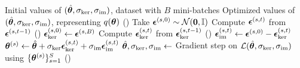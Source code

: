 \begin{algorithm}[t]
  \caption{The VIKING algorithm}
  \label{alg:viking}
  \begin{algorithmic}[1]
  \REQUIRE Initial values of $(\hat{\bm{\theta}}, \sigma_{\ker}, \sigma_{\operatorname{im}})$, dataset with $B$ mini-batches
  \ENSURE Optimized values of $(\hat{\bm{\theta}}, \sigma_{\ker}, \sigma_{\operatorname{im}})$, representing $q(\bm{\theta})$ ()
      \STATE Take $\bm{\epsilon}^{(s, 0)} \sim \mathcal{N}(\mathbf{0}, \mathbb{I})$
        \STATE Compute $\bm{\epsilon}^{(s, t)}$ from $\bm{\epsilon}^{(s, t-1)}$ () 
      \ENDFOR
      \STATE $\bm{\epsilon}_{\ker}^{(s, 0)} \gets \bm{\epsilon}^{(s, B)}$
    \ENDFOR
        \STATE Compute $\bm{\epsilon}_{\ker}^{(s, t)}$ from $\bm{\epsilon}_{\ker}^{(s, t-1)}$ ()
        \STATE $\bm{\epsilon}_{\operatorname{im}}^{(s, t)} \gets \bm{\epsilon}^{(s, 0)} - \bm{\epsilon}_{\ker}^{(s, t)}$
        \STATE $\bm{\theta}^{(s)} \gets \hat{\bm{\theta}} + \sigma_{\ker} \bm{\epsilon}_{\ker}^{(s, t)} + \sigma_{\operatorname{im}} \bm{\epsilon}_{\operatorname{im}}^{(s, t)}$ 
      \ENDFOR
      \STATE $\hat{\bm{\theta}}, \sigma_{\ker}, \sigma_{\operatorname{im}} \gets $ Gradient step on $\mathcal{L}(\hat{\bm{\theta}}, \sigma_{\ker}, \sigma_{\operatorname{im}})$ using $\{ \bm{\theta}^{(s)} \}_{s=1}^S$ ()
    \ENDFOR
  \ENDFOR
  \end{algorithmic}
\end{algorithm}

